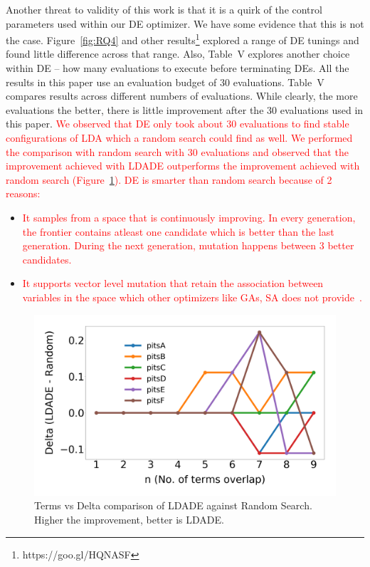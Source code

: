 \documentclass[twocolumn,5p,sort&compress]{elsarticle}
\newcommand{\bi}{\begin{itemize}}
\newcommand{\ei}{\end{itemize}}
\theoremstyle{break}
\begin{document}
Another threat to validity of this work is that it is a quirk of the control
parameters used within our DE optimizer.
We have some evidence that this is not the case.
Figure~\ref{fig:RQ4} and other results\footnote{https://goo.gl/HQNASF} explored a range of DE tunings and found
little difference across that range. Also, Table~V explores another choice within DE -- how
many evaluations to execute before terminating DEs. All the results in this paper use an
evaluation budget of 30 evaluations. Table~V
compares results across different numbers of evaluations. While clearly,
the more evaluations the better, there is little improvement after the
30 evaluations used in this paper. \textcolor{red}{We observed that DE only took about 30 evaluations to find stable configurations of LDA which a random search could find as well. We performed the  comparison with random search with 30 evaluations and observed that the improvement achieved with LDADE outperforms the improvement achieved with random search (Figure~\ref{fig:random}). DE is smarter than random search because of 2 reasons:} 
\bi
\item \textcolor{red}{It samples from a space that is continuously improving. In every generation, the frontier contains atleast one candidate which is better than the last generation. During the next generation, mutation happens between 3 better candidates.}
\item \textcolor{red}{It supports vector level mutation that retain the association between variables in the space which other optimizers like GAs, SA does not provide~\cite{das2011differential}.}
\ei
\begin{figure}[!htbp]
  \includegraphics[width=\linewidth]{./fig/delta_randomness.png}
  \caption{Terms vs Delta comparison of LDADE against Random Search. Higher the improvement, better is LDADE.}
  \label{fig:random}
\end{figure}
\end{document}
